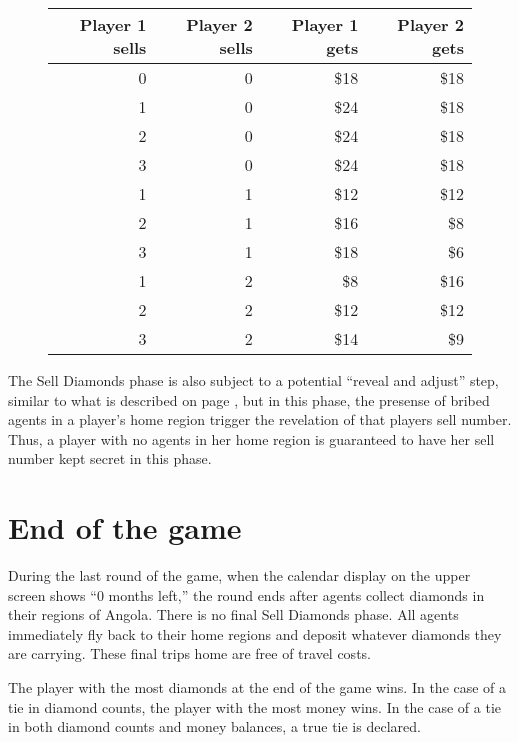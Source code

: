 \documentclass[8pt]{extbook}
\begin{document}
\begin{figure}[t]
\begin{center}
\begin{tabular}{r|r||r|r}
Player 1 sells & Player 2 sells & Player 1 gets & Player 2 gets\\
\hline
\hline
0 & 0 & \$18 & \$18 \\
\hline
1 & 0 & \$24 & \$18 \\
2 & 0 & \$24 & \$18 \\
3 & 0 & \$24 & \$18 \\
\hline
1 & 1 & \$12 & \$12 \\
2 & 1 & \$16 & \$8 \\
3 & 1 & \$18 & \$6 \\
\hline
1 & 2 & \$8 & \$16 \\
2 & 2 & \$12 & \$12 \\
3 & 2 & \$14 & \$9 \\
\end{tabular} 
\end{center}
\label{fig:sellTable}

\end{figure}

The Sell Diamonds phase is also subject to a potential ``reveal and adjust'' step, similar to what is described on page \pageref{sec:movesRevealed}, but in this phase, the presense of bribed agents in a player's home region trigger the revelation of that players sell number.  Thus, a player with no agents in her home region is guaranteed to have her sell number kept secret in this phase.


\section{End of the game}

During the last round of the game, when the calendar display on the upper screen shows ``0 months left,'' the round ends after agents collect diamonds in their regions of Angola.  There is no final Sell Diamonds phase.  All agents immediately fly back to their home regions and deposit whatever diamonds they are carrying.  These final trips home are free of travel costs.

The player with the most diamonds at the end of the game wins.  In the case of a tie in diamond counts, the player with the most money wins.  In the case of a tie in both diamond counts and money balances, a true tie is declared.
\end{document}
